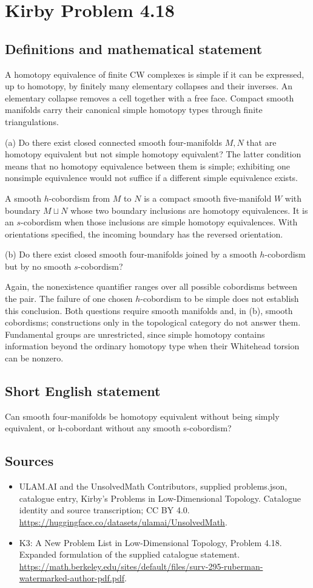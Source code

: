 \documentclass[11pt,a4paper]{article}
\begin{document}
\section*{Kirby Problem 4.18}\label{statement}

\subsection{Definitions and mathematical statement}
A homotopy equivalence of finite CW complexes is simple if it can be expressed, up to homotopy, by finitely many elementary collapses and their inverses. An elementary collapse removes a cell together with a free face. Compact smooth manifolds carry their canonical simple homotopy types through finite triangulations.

(a) Do there exist closed connected smooth four-manifolds $M,N$ that are homotopy equivalent but not simple homotopy equivalent? The latter condition means that no homotopy equivalence between them is simple; exhibiting one nonsimple equivalence would not suffice if a different simple equivalence exists.

A smooth $h$-cobordism from $M$ to $N$ is a compact smooth five-manifold $W$ with boundary $M\sqcup N$ whose two boundary inclusions are homotopy equivalences. It is an $s$-cobordism when those inclusions are simple homotopy equivalences. With orientations specified, the incoming boundary has the reversed orientation.

(b) Do there exist closed smooth four-manifolds joined by a smooth $h$-cobordism but by no smooth $s$-cobordism?

Again, the nonexistence quantifier ranges over all possible cobordisms between the pair. The failure of one chosen $h$-cobordism to be simple does not establish this conclusion. Both questions require smooth manifolds and, in (b), smooth cobordisms; constructions only in the topological category do not answer them. Fundamental groups are unrestricted, since simple homotopy contains information beyond the ordinary homotopy type when their Whitehead torsion can be nonzero.
\subsection{Short English statement}
Can smooth four-manifolds be homotopy equivalent without being simply equivalent, or h-cobordant without any smooth s-cobordism?
\subsection{Sources}
\begin{itemize}
\item[S1] ULAM.AI and the UnsolvedMath Contributors, supplied problems.json, catalogue entry, Kirby's Problems in Low-Dimensional Topology. Catalogue identity and source transcription; CC BY 4.0.
\url{https://huggingface.co/datasets/ulamai/UnsolvedMath}.
\item[S2] K3: A New Problem List in Low-Dimensional Topology, Problem 4.18. Expanded formulation of the supplied catalogue statement.
\url{https://math.berkeley.edu/sites/default/files/surv-295-ruberman-watermarked-author-pdf.pdf}.
\end{itemize}
\end{document}
